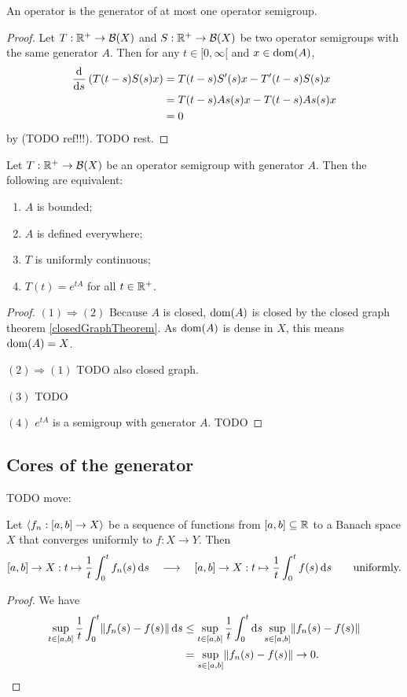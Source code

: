 \begin{proposition}
An operator is the generator of at most one operator semigroup.
\end{proposition}
\begin{proof}
Let $T: \mathbb{R}^+\to \operatorname{\mathcal{B}}(X)$ and $S: \mathbb{R}^+\to \operatorname{\mathcal{B}}(X)$ be two operator semigroups with the same generator $A$. Then for any $t\in [0,\infty[$ and $x\in \operatorname{dom}(A)$,
\begin{align*}
\mathinner{ \dfrac{\operatorname{d \!}{^{}}}{\operatorname{d \!}{{s}^{}}} } \left(T(t-s)S(s)x\right) &= T(t-s)S'(s)x - T'(t-s)S(s)x \\
&= T(t-s)As(s)x - T(t-s)As(s)x \\
&= 0
\end{align*}
by (TODO ref!!!). TODO rest.
\end{proof}

\begin{proposition} \label{boundedGenerator}
Let $T: \mathbb{R}^+\to \operatorname{\mathcal{B}}(X)$ be an operator semigroup with generator $A$. Then the following are equivalent:
\begin{enumerate}
\item $A$ is bounded;
\item $A$ is defined everywhere;
\item $T$ is uniformly continuous;
\item $T(t) = e^{tA}$ for all $t\in\mathbb{R} ^+$.
\end{enumerate}
\end{proposition}
\begin{proof}
$(1) \Rightarrow (2)$ Because $A$ is closed, $\operatorname{dom}(A)$ is closed by the closed graph theorem \ref{closedGraphTheorem}. As $\operatorname{dom}(A)$ is dense in $X$, this means $\operatorname{dom}(A) = X$.

$(2) \Rightarrow (1)$ TODO also closed graph.

$(3)$ TODO

$(4)$ $e^{tA}$ is a semigroup with generator $A$. TODO
\end{proof}

\subsection{Cores of the generator}
TODO move:
\begin{lemma} \label{uniformContinuityAverage}
Let $\left\langle f_n: [a,b]\to X \right\rangle$ be a sequence of functions from $[a,b]\subseteq \mathbb{R}$ to a Banach space $X$ that converges uniformly to $f: X\to Y$. Then
\[ [a,b]\to X: t\mapsto \frac{1}{t}\int_{0}^tf_n(s)\operatorname{d \!}{s} \quad\longrightarrow\quad [a,b]\to X: t\mapsto \frac{1}{t}\int_{0}^tf(s)\operatorname{d \!}{s} \qquad \text{uniformly.} \]
\end{lemma}
\begin{proof}
We have
\begin{align*}
\sup_{t\in[a,b]}\frac{1}{t}\int_0^t \lVert f_n(s) - f(s)\rVert\operatorname{d \!}{s} &\leq \sup_{t\in[a,b]}\frac{1}{t}\int_0^t \operatorname{d \!}{s}\sup_{s\in [a,b]} \lVert f_n(s) - f(s)\rVert \\
&= \sup_{s\in [a,b]} \lVert f_n(s) - f(s)\rVert \to 0.
\end{align*}
\end{proof}

